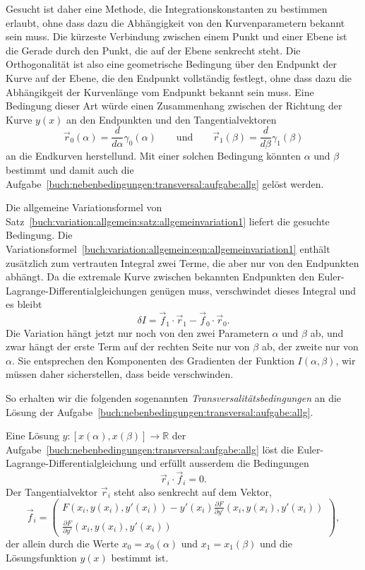 Gesucht ist daher eine Methode, die Integrationskonstanten zu bestimmen
erlaubt, ohne dass dazu die Abhängigkeit von den Kurvenparametern bekannt
sein muss.
Die kürzeste Verbindung zwischen einem Punkt und einer Ebene ist die
Gerade durch den Punkt, die auf der Ebene senkrecht steht.
Die Orthogonalität ist also eine geometrische Bedingung über den Endpunkt
der Kurve auf der Ebene, die den Endpunkt vollständig festlegt, ohne dass
dazu die Abhängikgeit der Kurvenlänge vom Endpunkt bekannt sein muss.
Eine Bedingung dieser Art würde einen Zusammenhang zwischen der Richtung
der Kurve $y(x)$ an den Endpunkten und den Tangentialvektoren
\[
\vec{r}_0(\alpha)
=
\frac{d}{d\alpha}\gamma_0(\alpha)
\qquad\text{und}\qquad
\vec{r}_1(\beta)
=
\frac{d}{d\beta}\gamma_1(\beta)
\]
an die Endkurven herstellund.
Mit einer solchen Bedingung könnten $\alpha$ und $\beta$ bestimmt und
damit auch die
Aufgabe~\ref{buch:nebenbedingungen:transversal:aufgabe:allg}
gelöst werden.

Die allgemeine Variationsformel von
Satz~\ref{buch:variation:allgemein:satz:allgemeinvariation1}
liefert die gesuchte Bedingung.
Die Variationsformel~\eqref{buch:variation:allgemein:eqn:allgemeinvariation1}
enthält zusätzlich zum vertrauten Integral zwei Terme, die aber nur von
den Endpunkten abhängt.
Da die extremale Kurve zwischen bekannten Endpunkten den
Euler-Lagrange-Differentialgleichungen genügen muss, verschwindet dieses
Integral und es bleibt
\[
\delta I
=
\vec{f}_1\cdot\vec{r}_1 - \vec{f}_0\cdot\vec{r}_0.
\]
Die Variation hängt jetzt nur noch von den zwei Parametern
$\alpha$ und $\beta$ ab, und zwar hängt der erste Term auf der rechten
Seite nur von $\beta$ ab, der zweite nur von $\alpha$.
Sie entsprechen den Komponenten des Gradienten der Funktion
$I(\alpha,\beta)$, wir müssen daher sicherstellen, dass beide
verschwinden.

So erhalten wir die folgenden sogenannten {\em Transversalitätsbedingungen}
an die Lösung der Aufgabe~\ref{buch:nebenbedingungen:transversal:aufgabe:allg}.
%

\begin{satz}[Transversalität]
\label{buch:nebenbedingungen:transversal:satz:transversal}
%
Eine Lösung $y\colon [x(\alpha),x(\beta)]\to \mathbb{R}$ der 
Aufgabe~\ref{buch:nebenbedingungen:transversal:aufgabe:allg}
löst die Euler-Lagrange-Differentialgleichung und erfüllt ausserdem
die Bedingungen
\begin{equation}
\vec{r}_i\cdot\vec{f}_i=0.
\end{equation}
Der Tangentialvektor $\vec{r}_i$ steht also senkrecht auf dem Vektor,
\begin{equation}
\vec{f}_i
=
\begin{pmatrix}
\displaystyle 
F(x_i, y(x_i),y'(x_i))-y'(x_i)\frac{\partial F}{\partial y'}(x_i,y(x_i),y'(x_i))
\\[3pt]
\displaystyle 
\frac{\partial F}{\partial y'}(x_i,y(x_i),y'(x_i))
\end{pmatrix},
\end{equation}
der allein durch die Werte $x_0 = x_0(\alpha)$ und $x_1=x_1(\beta)$
und die Lösungsfunktion $y(x)$ bestimmt ist.
\end{satz}


